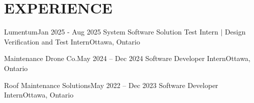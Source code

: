 \section{\textbf {\large EXPERIENCE}}
\resumeSubHeadingListStart

    \resumeSubheading
    {Lumentum}{Jan 2025 - Aug 2025}
    {System Software Solution Test Intern $|$ Design Verification and Test Intern}{Ottawa, Ontario}
    \resumeItemListStart
        \resumeItem{}
        \resumeItem{}
        \resumeItem{}
    \resumeItemListEnd
    
    \resumeSubheading
    {Maintenance Drone Co.}{May 2024 -- Dec 2024}
    {Software Developer Intern}{Ottawa, Ontario}
    \resumeItemListStart
        \resumeItem{}
        \resumeItem{}
        \resumeItem{}
    \resumeItemListEnd

    \resumeSubheading
    {Roof Maintenance Solutions}{May 2022 -- Dec 2023}
    {Software Developer Intern}{Ottawa, Ontario}
    \resumeItemListStart
        \resumeItem{}
        \resumeItem{}
        \resumeItem{}
    \resumeItemListEnd
    

\resumeSubHeadingListEnd